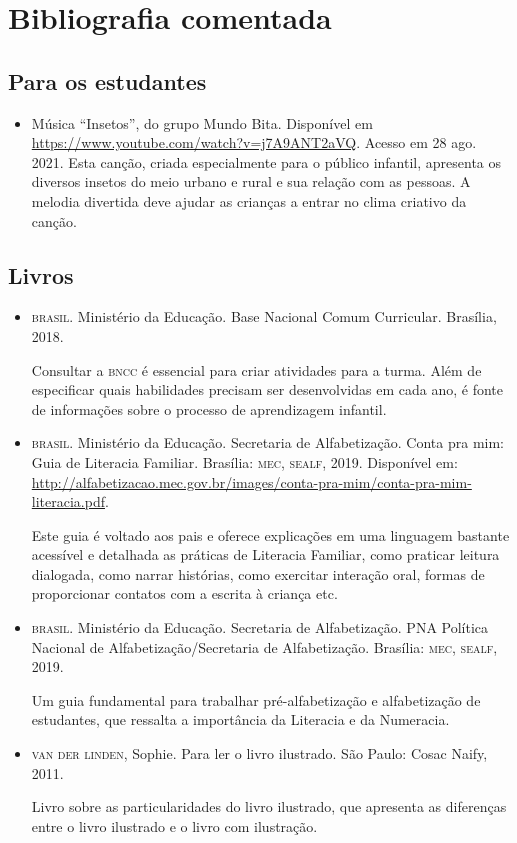 \documentclass[11pt]{extarticle}
\begin{document}
\section{Bibliografia comentada}

\subsection{Para os estudantes}
\begin{itemize}
\item Música ``Insetos'', do grupo Mundo Bita. Disponível em \url{https://www.youtube.com/watch?v=j7A9ANT2aVQ}. Acesso em 28 ago. 2021. 
Esta canção, criada especialmente para o público infantil, apresenta os diversos insetos do meio urbano e rural e sua relação com as pessoas. A melodia divertida deve ajudar as crianças a entrar no clima criativo da canção. 

\end{itemize}

\subsection{Livros}

\begin{itemize}
\item \textsc{brasil}. Ministério da Educação. Base Nacional Comum Curricular. Brasília, 2018.

Consultar a \textsc{bncc} é essencial para criar atividades para a turma. Além de especificar 
quais habilidades precisam ser desenvolvidas em cada ano, é fonte de informações sobre 
o processo de aprendizagem infantil. 

\item \textsc{brasil}. Ministério da Educação. Secretaria de Alfabetização. Conta pra mim: Guia de Literacia Familiar. 
Brasília: \textsc{mec, sealf}, 2019. Disponível em: \url{http://alfabetizacao.mec.gov.br/images/conta-pra-mim/conta-pra-mim-literacia.pdf}.

Este guia é voltado aos pais e oferece explicações em uma linguagem bastante acessível e detalhada as práticas de Literacia Familiar, 
como praticar leitura dialogada, como narrar histórias, como exercitar interação oral, formas de proporcionar contatos com a escrita à criança etc. 
 
\item \textsc{brasil}. Ministério da Educação. Secretaria de Alfabetização. PNA Política Nacional de Alfabetização/Secretaria 
de Alfabetização. Brasília: \textsc{mec, sealf}, 2019.

Um guia fundamental para trabalhar pré-alfabetização e alfabetização de estudantes, que ressalta a importância da Literacia e da Numeracia. 

\item \textsc{van der linden}, Sophie. Para ler o livro ilustrado. São Paulo: Cosac Naify, 2011.

Livro sobre as particularidades do livro ilustrado, que apresenta as diferenças entre o livro ilustrado e o livro com ilustração. 
\end{itemize}
\end{document}
